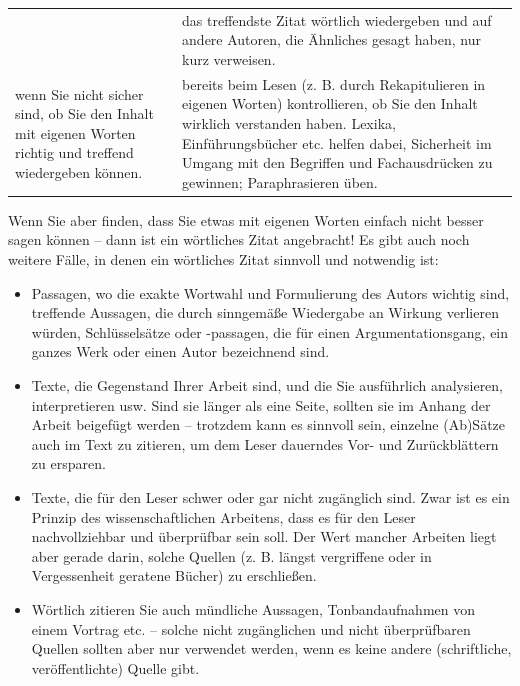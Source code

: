 \documentclass[]{book}
\providecommand{\tightlist}{%
  \setlength{\itemsep}{0pt}\setlength{\parskip}{0pt}}
\theoremstyle{definition}
\theoremstyle{definition}
\theoremstyle{definition}
\theoremstyle{remark}
\begin{document}
\begin{longtable}[]{@{}ll@{}}
\begin{minipage}[t]{0.24\columnwidth}
\end{minipage} & \begin{minipage}[t]{0.70\columnwidth}\raggedright\strut
das treffendste Zitat wörtlich wiedergeben und auf andere Autoren, die
Ähnliches gesagt haben, nur kurz verweisen. \vspace{-6mm}\strut
\end{minipage}\tabularnewline
\begin{minipage}[t]{0.24\columnwidth}\raggedright\strut
wenn Sie nicht sicher sind, ob Sie den Inhalt mit eigenen Worten richtig
und treffend wiedergeben können.\strut
\end{minipage} & \begin{minipage}[t]{0.70\columnwidth}\raggedright\strut
bereits beim Lesen (z. B. durch Rekapitulieren in eigenen Worten)
kontrollieren, ob Sie den Inhalt wirklich verstanden haben. Lexika,
Einführungsbücher etc. helfen dabei, Sicherheit im Umgang mit den
Begriffen und Fachausdrücken zu gewinnen; Paraphrasieren üben.\strut
\end{minipage}\tabularnewline
\bottomrule
\end{longtable}

Wenn Sie aber finden, dass Sie etwas mit eigenen Worten einfach nicht
besser sagen können -- dann ist ein wörtliches Zitat angebracht! Es gibt
auch noch weitere Fälle, in denen ein wörtliches Zitat sinnvoll und
notwendig ist:

\begin{itemize}
\tightlist
\item
  Passagen, wo die exakte Wortwahl und Formulierung des Autors wichtig
  sind, treffende Aussagen, die durch sinngemäße Wiedergabe an Wirkung
  verlieren würden, Schlüsselsätze oder -passagen, die für einen
  Argumentationsgang, ein ganzes Werk oder einen Autor bezeichnend sind.
\item
  Texte, die Gegenstand Ihrer Arbeit sind, und die Sie ausführlich
  analysieren, interpretieren usw. Sind sie länger als eine Seite,
  sollten sie im Anhang der Arbeit beigefügt werden -- trotzdem kann es
  sinnvoll sein, einzelne (Ab)Sätze auch im Text zu zitieren, um dem
  Leser dauerndes Vor- und Zurückblättern zu ersparen.
\item
  Texte, die für den Leser schwer oder gar nicht zugänglich sind. Zwar
  ist es ein Prinzip des wissenschaftlichen Arbeitens, dass es für den
  Leser nachvollziehbar und überprüfbar sein soll. Der Wert mancher
  Arbeiten liegt aber gerade darin, solche Quellen (z. B. längst
  vergriffene oder in Vergessenheit geratene Bücher) zu erschließen.
\item
  Wörtlich zitieren Sie auch mündliche Aussagen, Tonbandaufnahmen von
  einem Vortrag etc. -- solche nicht zugänglichen und nicht
  überprüfbaren Quellen sollten aber nur verwendet werden, wenn es keine
  andere (schriftliche, veröffentlichte) Quelle gibt.
\end{itemize}
\end{document}
